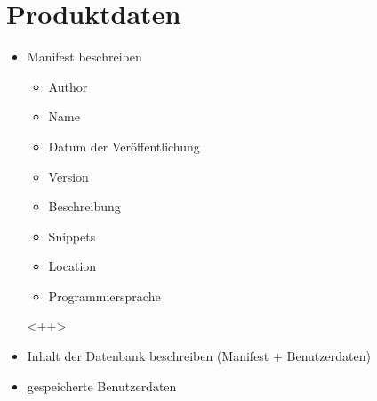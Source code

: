 
\chapter{Produktdaten}

\begin{itemize}
	\item Manifest beschreiben
		\begin{itemize}
			\item Author
			\item Name
			\item Datum der Veröffentlichung
			\item Version
			\item Beschreibung
			\item Snippets
			\item Location
			\item Programmiersprache
		\end{itemize}<++>
	\item Inhalt der Datenbank beschreiben (Manifest + Benutzerdaten)
	\item gespeicherte Benutzerdaten
\end{itemize}
